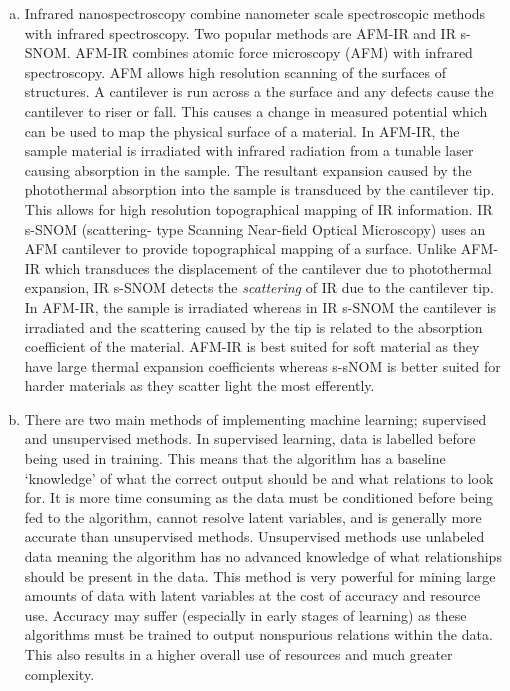 \documentclass[titlepage]{article}
\begin{document}
\begin{enumerate}[a)]
    \item
    Infrared nanospectroscopy combine nanometer scale spectroscopic methods with infrared spectroscopy. 
    Two popular methods are AFM-IR and IR s-SNOM. AFM-IR combines atomic force microscopy (AFM)
    with infrared spectroscopy. AFM allows high resolution scanning of the surfaces of 
    structures. A cantilever is run across a the surface and any defects cause the cantilever 
    to riser or fall. This causes a change in measured potential which can be used to map the 
    physical surface of a material. In AFM-IR, the sample material is irradiated with infrared 
    radiation from a tunable laser causing absorption in the sample. The resultant expansion 
    caused by the photothermal absorption into the sample is transduced by the cantilever tip. 
    This allows for high resolution topographical mapping of IR information. IR s-SNOM (scattering-
    type Scanning Near-field Optical Microscopy) uses an AFM cantilever to provide topographical 
    mapping of a surface. Unlike AFM-IR which transduces the displacement of the cantilever 
    due to photothermal expansion, IR s-SNOM detects the \emph{scattering} of IR due to 
    the cantilever tip. In AFM-IR, the sample is irradiated whereas in IR s-SNOM the cantilever is 
    irradiated and the scattering caused by the tip is related to the absorption 
    coefficient of the material. AFM-IR is best suited for soft material 
    as they have large thermal expansion coefficients whereas s-sNOM is 
    better suited for harder materials as they scatter light the most efferently.
    
    \item
    There are two main methods of implementing machine learning; supervised and unsupervised 
    methods. In supervised learning, data is labelled before being used in training. 
    This means that the algorithm has a baseline `knowledge' of what the correct output 
    should be and what relations to look for. It is more time consuming as the data must be conditioned
    before being fed to the algorithm, cannot resolve latent variables, and is generally 
    more accurate than unsupervised methods. Unsupervised methods use unlabeled data 
    meaning the algorithm has no advanced knowledge of what relationships should be present in the 
    data. This method is very powerful for mining large amounts of data with latent variables at the cost
    of accuracy and resource use. Accuracy may suffer (especially in early stages of learning) as these algorithms
    must be trained to output nonspurious relations within the data. This also results in a higher overall 
    use of resources and much greater complexity. 
\end{enumerate}
\end{document}
